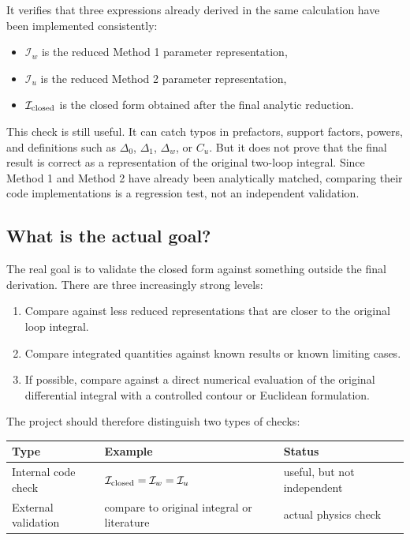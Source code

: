 \documentclass[11pt,a4paper]{article}
\begin{document}
It verifies that three expressions already derived in the same calculation have been implemented consistently:
\begin{itemize}
  \item \(\mathcal I_w\) is the reduced Method 1 parameter representation,
  \item \(\mathcal I_u\) is the reduced Method 2 parameter representation,
  \item \(\mathcal I_{\rm closed}\) is the closed form obtained after the final analytic reduction.
\end{itemize}

This check is still useful. It can catch typos in prefactors, support factors, powers, and definitions such as \(\Delta_0\), \(\Delta_1\), \(\Delta_w\), or \(C_u\). But it does not prove that the final result is correct as a representation of the original two-loop integral. Since Method 1 and Method 2 have already been analytically matched, comparing their code implementations is a regression test, not an independent validation.

\subsection{What is the actual goal?}

The real goal is to validate the closed form against something outside the final derivation. There are three increasingly strong levels:
\begin{enumerate}
  \item Compare against less reduced representations that are closer to the original loop integral.
  \item Compare integrated quantities against known results or known limiting cases.
  \item If possible, compare against a direct numerical evaluation of the original differential integral with a controlled contour or Euclidean formulation.
\end{enumerate}

The project should therefore distinguish two types of checks:
\begin{center}
\begin{tabular}{lll}
\toprule
Type & Example & Status \\
\midrule
Internal code check & \(\mathcal I_{\rm closed}=\mathcal I_w=\mathcal I_u\) & useful, but not independent \\
External validation & compare to original integral or literature & actual physics check \\
\bottomrule
\end{tabular}
\end{center}
\end{document}
